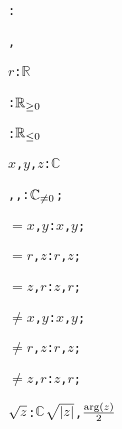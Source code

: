 \begin{alltt}
: 

   , 

  \(r\):  \(\mathbb{R}\)\vspace*{\pvsdeclspacing}

  :  \({\pvssubscript{\mathbb{R}}{{\geq}0}}\)\vspace*{\pvsdeclspacing}

  :  \({\pvssubscript{\mathbb{R}}{{\leq}0}}\)\vspace*{\pvsdeclspacing}

  \(x\), \(y\), \(z\):  \(\mathbb{C}\)\vspace*{\pvsdeclspacing}

  , , :  \({\pvssubscript{\mathbb{C}}{{\not=}0}}\);\vspace*{\pvsdeclspacing}

  \(=\)\pvsid{(}\(x\), \(y\)\pvsid{)}:   \pvskey{=} \pvsid{(}\(x\), \(y\)\pvsid{)};\vspace*{\pvsdeclspacing}

  \(=\)\pvsid{(}\(r\), \(z\)\pvsid{)}:   \pvskey{=} \pvsid{(}\(r\), \(z\)\pvsid{)};\vspace*{\pvsdeclspacing}

  \(=\)\pvsid{(}\(z\), \(r\)\pvsid{)}:   \pvskey{=} \pvsid{(}\(z\), \(r\)\pvsid{)};\vspace*{\pvsdeclspacing}

  \(\neq\)\pvsid{(}\(x\), \(y\)\pvsid{)}:   \pvskey{=} \pvsid{(}\(x\), \(y\)\pvsid{)};\vspace*{\pvsdeclspacing}

  \(\neq\)\pvsid{(}\(r\), \(z\)\pvsid{)}:   \pvskey{=} \pvsid{(}\(r\), \(z\)\pvsid{)};\vspace*{\pvsdeclspacing}

  \(\neq\)\pvsid{(}\(z\), \(r\)\pvsid{)}:   \pvskey{=} \pvsid{(}\(z\), \(r\)\pvsid{)};\vspace*{\pvsdeclspacing}

  \(\sqrtonefn{z}\): \(\mathbb{C}\) \pvskey{=} \pvsid{(}\(\sqrtonefn{\absonefn{z}}\), \(\opdividetwofn{\pvsid{arg}\pvsid{(}z\pvsid{)}}{2}\)\pvsid{)}\vspace*{\pvsdeclspacing}


\end{alltt}
